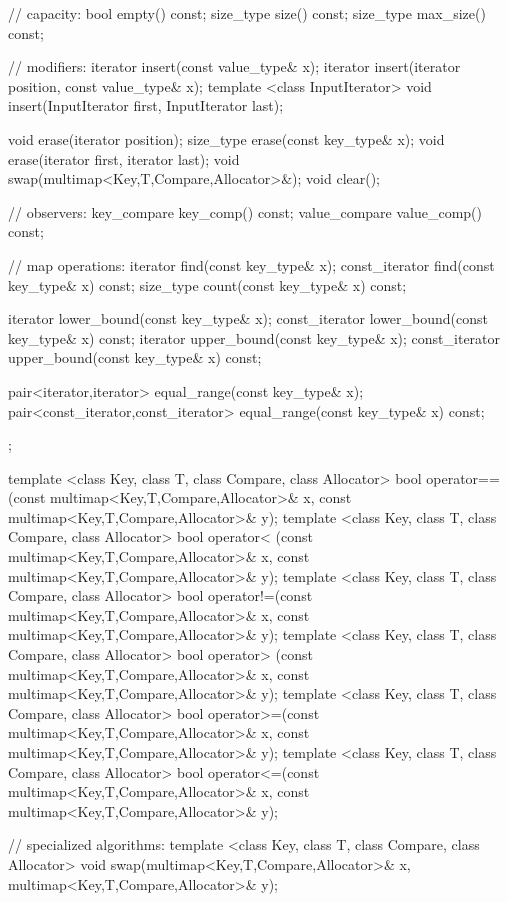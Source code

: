 \begin{codeblock}
{{    // capacity:
    bool           empty() const;
    size_type      size() const;
    size_type      max_size() const;

    // modifiers:
    iterator insert(const value_type& x);
    iterator insert(iterator position, const value_type& x);
    template <class InputIterator>
      void insert(InputIterator first, InputIterator last);

    void      erase(iterator position);
    size_type erase(const key_type& x);
    void      erase(iterator first, iterator last);
    void swap(multimap<Key,T,Compare,Allocator>&);
    void clear();

    // observers:
    key_compare    key_comp() const;
    value_compare  value_comp() const;

    // map operations:
    iterator       find(const key_type& x);
    const_iterator find(const key_type& x) const;
    size_type      count(const key_type& x) const;

    iterator       lower_bound(const key_type& x);
    const_iterator lower_bound(const key_type& x) const;
    iterator       upper_bound(const key_type& x);
    const_iterator upper_bound(const key_type& x) const;

    pair<iterator,iterator>
      equal_range(const key_type& x);
    pair<const_iterator,const_iterator>
      equal_range(const key_type& x) const;
  };

  template <class Key, class T, class Compare, class Allocator>
    bool operator==(const multimap<Key,T,Compare,Allocator>& x,
                    const multimap<Key,T,Compare,Allocator>& y);
  template <class Key, class T, class Compare, class Allocator>
    bool operator< (const multimap<Key,T,Compare,Allocator>& x,
                    const multimap<Key,T,Compare,Allocator>& y);
  template <class Key, class T, class Compare, class Allocator>
    bool operator!=(const multimap<Key,T,Compare,Allocator>& x,
                    const multimap<Key,T,Compare,Allocator>& y);
  template <class Key, class T, class Compare, class Allocator>
    bool operator> (const multimap<Key,T,Compare,Allocator>& x,
                    const multimap<Key,T,Compare,Allocator>& y);
  template <class Key, class T, class Compare, class Allocator>
    bool operator>=(const multimap<Key,T,Compare,Allocator>& x,
                    const multimap<Key,T,Compare,Allocator>& y);
  template <class Key, class T, class Compare, class Allocator>
    bool operator<=(const multimap<Key,T,Compare,Allocator>& x,
                    const multimap<Key,T,Compare,Allocator>& y);

  // specialized algorithms:
  template <class Key, class T, class Compare, class Allocator>
    void swap(multimap<Key,T,Compare,Allocator>& x,
              multimap<Key,T,Compare,Allocator>& y);
}
\end{codeblock}%
%

